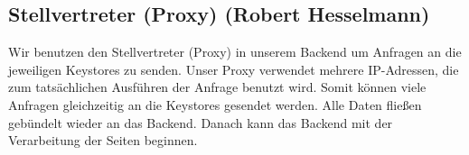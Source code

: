 \subsection*{Stellvertreter (Proxy) (Robert Hesselmann)}

Wir benutzen den Stellvertreter (Proxy) in unserem Backend um Anfragen an die jeweiligen Keystores zu senden. Unser Proxy verwendet mehrere IP-Adressen, die zum tatsächlichen Ausführen der Anfrage benutzt wird. Somit können viele Anfragen gleichzeitig an die Keystores gesendet werden. Alle Daten fließen gebündelt wieder an das Backend. Danach kann das Backend mit der Verarbeitung der Seiten beginnen.